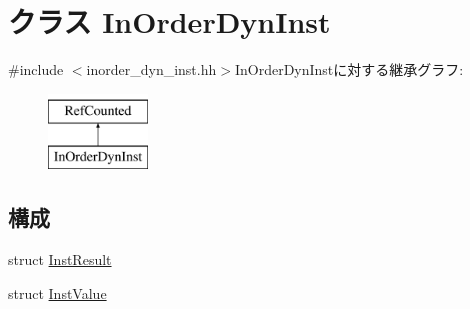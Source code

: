 \hypertarget{classInOrderDynInst}{
\section{クラス InOrderDynInst}
\label{classInOrderDynInst}
}


{\ttfamily \#include $<$inorder\_\-dyn\_\-inst.hh$>$}InOrderDynInstに対する継承グラフ:\begin{figure}[H]
\begin{center}
\leavevmode
\includegraphics[height=2cm]{classInOrderDynInst}
\end{center}
\end{figure}
\subsection*{構成}
\begin{DoxyCompactItemize}
\item 
struct \hyperlink{structInOrderDynInst_1_1InstResult}{InstResult}
\item 
struct \hyperlink{structInOrderDynInst_1_1InstValue}{InstValue}
\end{DoxyCompactItemize}
